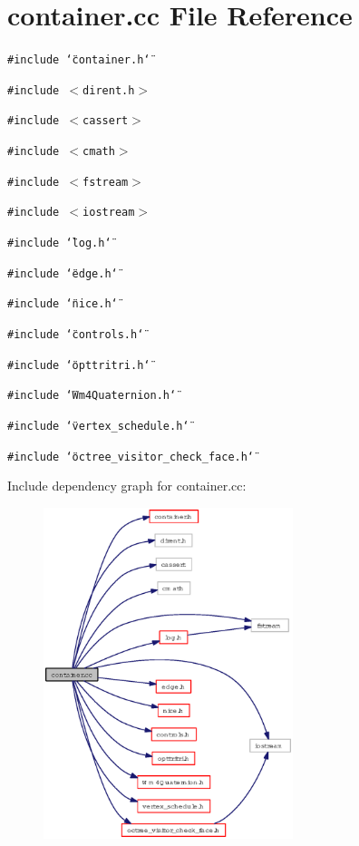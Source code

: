 \section{container.cc File Reference}
\label{container_8cc}
{\tt \#include \char`\"{}container.h\char`\"{}}\par
{\tt \#include $<$dirent.h$>$}\par
{\tt \#include $<$cassert$>$}\par
{\tt \#include $<$cmath$>$}\par
{\tt \#include $<$fstream$>$}\par
{\tt \#include $<$iostream$>$}\par
{\tt \#include \char`\"{}log.h\char`\"{}}\par
{\tt \#include \char`\"{}edge.h\char`\"{}}\par
{\tt \#include \char`\"{}nice.h\char`\"{}}\par
{\tt \#include \char`\"{}controls.h\char`\"{}}\par
{\tt \#include \char`\"{}opttritri.h\char`\"{}}\par
{\tt \#include \char`\"{}Wm4Quaternion.h\char`\"{}}\par
{\tt \#include \char`\"{}vertex\_\-schedule.h\char`\"{}}\par
{\tt \#include \char`\"{}octree\_\-visitor\_\-check\_\-face.h\char`\"{}}\par


Include dependency graph for container.cc:\begin{figure}[H]
\begin{center}
\leavevmode
\includegraphics[width=206pt]{container_8cc__incl}
\end{center}
\end{figure}
